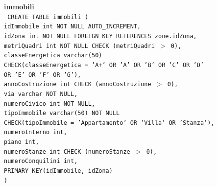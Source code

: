 \documentclass[a4paper,12pt]{report}
\begin{document}
                \noindent
                {\large \textbf{immobili}} \\
                \texttt{
                    CREATE TABLE immobili ( \\
                    \null\quad\quad idImmobile           int NOT NULL AUTO\_INCREMENT, \\
                    \null\quad\quad idZona               int NOT NULL               FOREIGN KEY REFERENCES zone.idZona, \\
                    \null\quad\quad metriQuadri          int NOT NULL               CHECK (metriQuadri $>$ 0), \\
                    \null\quad\quad classeEnergetica     varchar(50) \\
                            \null\qquad\qquad CHECK(classeEnergetica = 'A+' OR 'A' OR 'B' OR 'C' OR 'D' \\\null\qquad\qquad OR 'E' OR 'F' OR 'G'), \\
                    \null\quad\quad annoCostruzione      int                    CHECK (annoCostruzione $>$ 0), \\
                    \null\quad\quad via                  varchar                NOT NULL, \\
                    \null\quad\quad numeroCivico         int                    NOT NULL, \\
                    \null\quad\quad tipoImmobile         varchar(50)         NOT NULL \\
                            \null\qquad\qquad CHECK(tipoImmobile = 'Appartamento' OR 'Villa' OR 'Stanza'), \\
                    \null\quad\quad numeroInterno        int, \\
                    \null\quad\quad piano                int, \\
                    \null\quad\quad numeroStanze         int                    CHECK (numeroStanze $>$ 0), \\
                    \null\quad\quad numeroConquilini     int, \\
                    \null\quad\quad PRIMARY KEY(idImmobile, idZona) \\
                    )
                } \\
\end{document}
